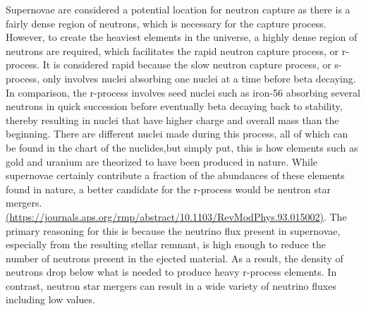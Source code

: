 \documentclass[11pt,a4paper]{article}
\begin{document}
Supernovae are considered a potential location for neutron capture as there is a fairly dense region of neutrons, which is necessary for the capture process. However, to create the heaviest elements in the universe, a highly dense region of neutrons are required, which facilitates the rapid neutron capture process, or r-process. It is considered rapid because the slow neutron capture process, or s-process, only involves nuclei absorbing one nuclei at a time before beta decaying. In comparison, the r-process involves seed nuclei such as iron-56 absorbing several neutrons in quick succession before eventually beta decaying back to stability, thereby resulting in nuclei that have higher charge and overall mass than the beginning. There are different nuclei made during this process, all of which can be found in the chart of the nuclides,but simply put, this is how elements such as gold and uranium are theorized to have been produced in nature. While supernovae certainly contribute a fraction of the abundances of these elements found in nature, a better candidate for the r-process would be neutron star mergers. \url{(https://journals.aps.org/rmp/abstract/10.1103/RevModPhys.93.015002)}. The primary reasoning for this is because the neutrino flux present in supernovae, especially from the resulting stellar remnant, is high enough to reduce the number of neutrons present in the ejected material. As a result, the density of neutrons drop below what is needed to produce heavy r-process elements. In contrast, neutron star mergers can result in a wide variety of neutrino fluxes including low values.
\end{document}
